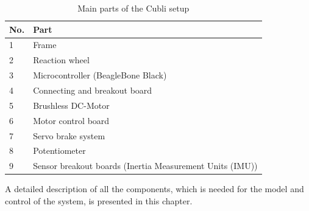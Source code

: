 \begin{table}[H]
	\begin{tabular}{|l|p{6.7cm}|}
		\hline %
		\textbf{No.} &\textbf{Part} 			\\
		\hline %
		1            & Frame           			\\
		\hline %
		2            & Reaction wheel      		\\
		\hline %
		3            & Microcontroller (BeagleBone Black)  \\
		\hline %
		4            & Connecting and breakout board 			\\
		\hline %
		5            & Brushless DC-Motor       			\\
		\hline %
		6            & Motor control board   	\\
		\hline %
		7            & Servo brake system     	\\
		\hline %
		8            & Potentiometer 		    	\\
		\hline %
		9            & Sensor breakout boards (Inertia Measurement Units (IMU)) 		    	\\
		\hline %
	\end{tabular}
	\caption{Main parts of the Cubli setup}
	\label{TableAAUCubliComponent}
\end{table}

A detailed description of all the components, which is needed for the model and control of the system, is presented in this chapter.


